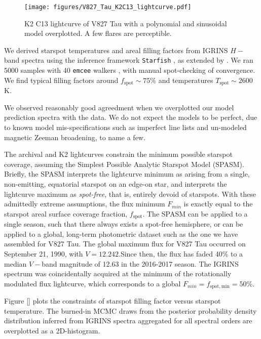 \documentclass[twocolumn]{emulateapj}%
\begin{document}
 \begin{figure*}
 \centering
 \texttt{[image: figures/V827\_Tau\_K2C13\_lightcurve.pdf]}
 \caption{K2 C13 lightcurve of V827 Tau with a polynomial and sinusoidal model overplotted.  A few flares are perceptible.}
 \label{fig:V827TauK2}
\end{figure*}

We derived starspot temperatures and areal filling factors from IGRINS $H-$band spectra using the inference framework \texttt{Starfish} \citep{czekala15}, as extended by \citet{2017ApJ...836..200G}.  We ran 5000 samples with 40 \texttt{emcee} walkers \citep{foreman13}, with manual spot-checking of convergence.  We find typical filling factors around $f_\mathrm{spot} \sim 75\%$ and temperatures $T_\mathrm{spot} \sim 2600$ K.

We observed reasonably good agreedment when we overplotted our model prediction spectra with the data.  We do not expect the models to be perfect, due to known model mis-specifications such as imperfect line lists and un-modeled magnetic Zeeman broadening, to name a few.

The archival and K2 lightcurves constrain the minimum possible starspot coverage, assuming the Simplest Possible Analytic Starspot Model (SPASM).  Briefly, the SPASM interprets the lightcurve minimum as arising from a single, non-emitting, equatorial starspot on an edge-on star, and interprets the lightcurve maximum as \emph{spot-free}, that is, entirely devoid of starspots.  With these admittedly extreme assumptions, the flux minimum $F_{min}$ is exactly equal to the starspot areal surface coverage fraction, $f_{\mathrm{spot}}$.  The SPASM can be applied to a single season, such that there always exists a spot-free hemisphere, or can be applied to a global, long-term photometric dataset such as the one we have assembled for V827 Tau.  The global maximum flux for V827 Tau occurred on September 21, 1990, with $V=12.242$.Since then, the flux has faded 40\% to a median $V-$band magnitude of 12.63 in the 2016-2017 season.  The IGRINS spectrum was coincidentally acquired at the minimum of the rotationally modulated flux lightcurve, which corresponds to a global $F_{min} = f_{\mathrm{spot, min}} = 50\%$.

Figure \ref{} plots the constraints of starspot filling factor versus starspot temperature.  The burned-in MCMC draws from the posterior probability density distribution inferred from IGRINS spectra aggregated for all spectral orders are overplotted as a 2D-histogram.
\end{document}
